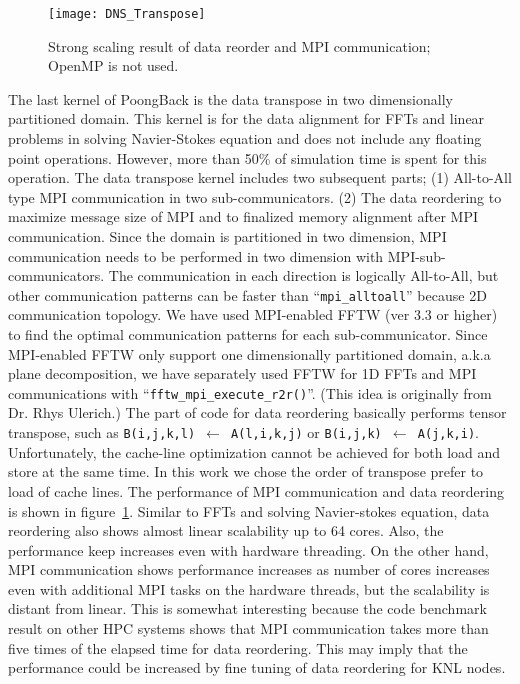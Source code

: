 \begin{figure}[htb]
 \begin{center}
   \texttt{[image: DNS\_Transpose]}
   \caption{Strong scaling result of data reorder and MPI communication; OpenMP is not used.}
   \label{fig:DNS_strong_scale_transpose}
 \end{center}
\end{figure}

The last kernel of PoongBack is the data transpose in two dimensionally partitioned domain. This kernel is for the data alignment for FFTs and linear problems in solving Navier-Stokes equation and does not include any floating point operations. However, more than 50\% of simulation time is spent for this operation. The data transpose kernel includes two subsequent parts; (1) All-to-All type MPI communication in two sub-communicators. (2) The data reordering to maximize message size of MPI and to finalized memory alignment after MPI communication. Since the domain is partitioned in two dimension, MPI communication needs to be performed in two dimension with MPI-sub-communicators. The communication in each direction is logically All-to-All, but other communication patterns can be faster than ``{\tt mpi\_alltoall}'' because 2D communication topology. We have used MPI-enabled FFTW (ver 3.3 or higher) to find the optimal communication patterns for each sub-communicator. Since MPI-enabled FFTW only support one dimensionally partitioned domain, a.k.a plane decomposition, we have separately used FFTW for 1D FFTs and MPI communications with ``{\tt fftw\_mpi\_execute\_r2r()}''. (This idea is originally from Dr. Rhys Ulerich.) The part of code for data reordering basically performs tensor transpose, such as {\tt B(i,j,k,l) $\leftarrow$ A(l,i,k,j)} or {\tt B(i,j,k) $\leftarrow$ A(j,k,i)}. Unfortunately, the cache-line optimization cannot be achieved for both load and store at the same time. In this work we chose the order of transpose prefer to load of cache lines. The performance of MPI communication and data reordering is shown in figure~\ref{fig:DNS_strong_scale_transpose}. Similar to FFTs and solving Navier-stokes equation, data reordering also shows almost linear scalability up to 64 cores. Also, the performance keep increases even with hardware threading. On the other hand, MPI communication shows performance increases as number of cores increases even with additional MPI tasks on the hardware threads, but the scalability is distant from linear. This is somewhat interesting because the code benchmark result on other HPC systems shows that MPI communication takes more than five times of the elapsed time for data reordering. \cite{Lee:2013kv} This may imply that the performance could be increased by fine tuning of data reordering for KNL nodes.

